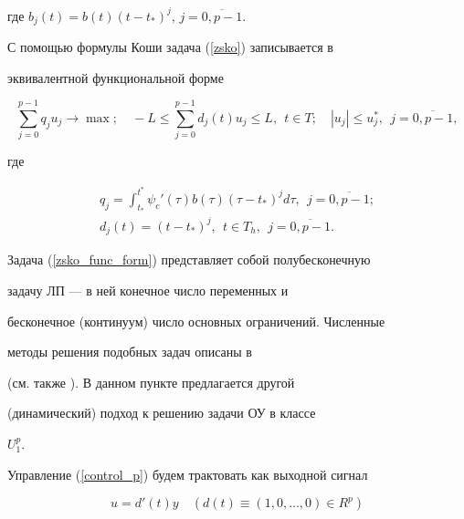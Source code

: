 где $b_j(t) = b(t)(t-t_*)^j$, $j=\overline{0,p-1}$.





С помощью формулы Коши задача (\ref{zsko}) записывается в


эквивалентной функциональной форме


\begin{equation}\label{zsko_func_form}


\sum\limits_{j=0}^{p-1} q_j u_j \to \max; \quad -L \leq


\sum\limits_{j=0}^{p-1} d_j(t)u_j \leq L, \ \ t \in T; \quad


|u_j| \leq u_j^*, \ \ j=\overline{0,p-1},


\end{equation}


где


\begin{gather*}


q_j = \int_{t_*}^{t^*} \psi_c'(\tau) b(\tau) (\tau-t_*)^{j}


d\tau, \ \ j=\overline{0,p-1};\\


%


d_j(t) = (t-t_*)^{j}, \ \ t \in T_h, \ \ j=\overline{0,p-1}.


\end{gather*}





Задача (\ref{zsko_func_form}) представляет собой полубесконечную


задачу ЛП --- в ней конечное число переменных и


бесконечное (континуум) число основных ограничений. Численные


методы решения подобных задач описаны в \cite{KMO3}


(см. также \cite{Medv}). В данном пункте предлагается другой


(динамический) подход к решению задачи ОУ в классе


$U_1^p$.





Управление (\ref{control_p}) будем трактовать как выходной сигнал


\begin{equation}\label{vyh_sign}


u = d'(t)y \quad (d(t) \equiv (1, 0, \dotsc, 0) \in R^p)


\end{equation}


